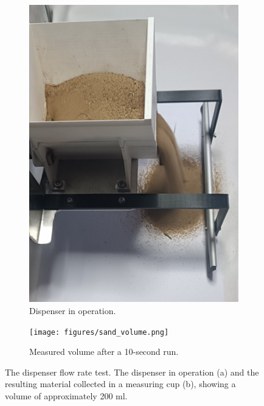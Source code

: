 \begin{figure}[h!]
    \centering
    \begin{subfigure}[b]{0.49\textwidth}
        \centering
        \includegraphics[width=\textwidth]{figures/sand_dispensing.png}
        \caption{Dispenser in operation.}
        \label{fig:dispenser_action}
    \end{subfigure}
    \hfill
    \begin{subfigure}[b]{0.49\textwidth}
        \centering
        \texttt{[image: figures/sand\_volume.png]}
        \caption{Measured volume after a 10-second run.}
        \label{fig:dispensed_volume}
    \end{subfigure}
    \caption{The dispenser flow rate test. The dispenser in operation (a) and the resulting material collected in a measuring cup (b), showing a volume of approximately 200 ml.}
    \label{fig:dispenser_test}
\end{figure}

